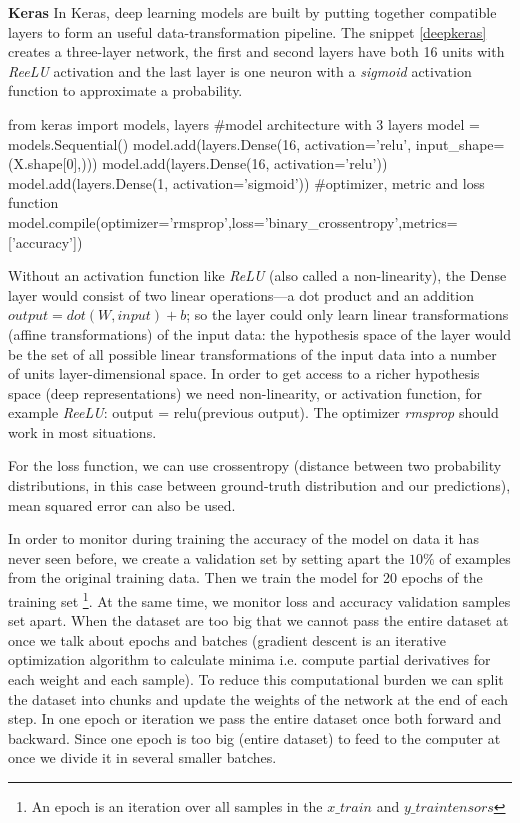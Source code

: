 \documentclass[11pt]{article}
\theoremstyle{definition}
\theoremstyle{remark}
\begin{document}
{\textbf{Keras}
In Keras, deep learning models are built by putting together compatible layers to form an useful data-transformation pipeline. The snippet \ref{deepkeras} creates a three-layer network, the first and second layers have both 16 units with \emph{ReeLU} activation and the last layer is one neuron with a \emph{sigmoid} activation function to approximate a probability.

\begin{code}[caption=Deep network 3 layers, label=deepkeras]
from keras import models, layers
#model architecture with 3 layers
model = models.Sequential()
model.add(layers.Dense(16, activation='relu', input_shape=(X.shape[0],)))
model.add(layers.Dense(16, activation='relu'))
model.add(layers.Dense(1, activation='sigmoid'))
#optimizer, metric and loss function 
model.compile(optimizer='rmsprop',loss='binary_crossentropy',metrics=['accuracy'])
\end{code}
Without an activation function like \emph{ReLU} (also called a non-linearity), the Dense layer would consist of two linear operations—a dot product and an addition $output = dot(W, input) + b$; so the layer could only learn linear transformations (affine transformations) of the input data: the hypothesis space of the layer would be the set of all possible linear transformations of the input data into a number of units layer-dimensional space. 
In order to get access to a richer hypothesis space (deep representations) we need non-linearity, or activation function, for example \emph{ReeLU}: output = relu(previous output). The optimizer \textit{rmsprop} should work in most situations.

For the loss function, we can use crossentropy (distance between two probability distributions, in this case between ground-truth distribution and our predictions), mean squared error can also be used. 

In order to monitor during training the accuracy of the model on data it has never seen before, we create a validation set by setting apart the $10\%$ of examples from the original training data. Then we train the model for 20 epochs of the training set \footnote{An epoch is an iteration over all samples in the $x\_train$ and $y\_train tensors$}. At the same time, we monitor loss and accuracy validation samples set apart.
When the dataset are too big that we cannot pass the entire dataset at once we talk about epochs and batches (gradient descent  is an iterative optimization algorithm to calculate minima i.e. compute partial derivatives for each weight and each sample). To reduce this computational burden we can split the dataset into chunks and update the weights of the network at the end of each step. In one epoch or iteration we pass the entire dataset once both forward and backward. Since one epoch is too big (entire dataset) to feed to the computer at once we divide it in several smaller batches.

}
\end{document}
